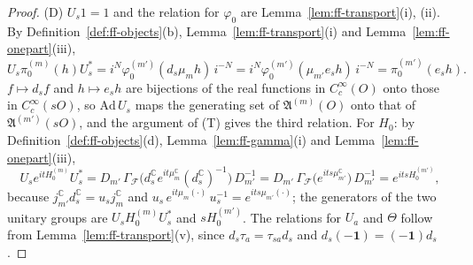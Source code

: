 \documentclass[11pt,a4paper]{article}
\theoremstyle{plain}
\theoremstyle{definition}
\theoremstyle{plain}
\theoremstyle{definition}
\newcommand{\C}{\mathbb{C}}
\newcommand{\A}{\mathfrak{A}}
\begin{document}
\begin{proof}
(D) $U_s1=1$ and the relation for $\varphi_0$ are Lemma~\ref{lem:ff-transport}(i), (ii).  By
Definition~\ref{def:ff-objects}(b), Lemma~\ref{lem:ff-transport}(i) and
Lemma~\ref{lem:ff-onepart}(iii),
\[
 U_s\pi_0^{(m)}(h)U_s^*=i^N\varphi_0^{(m')}(d_s\mu_mh)\,i^{-N}
 =i^N\varphi_0^{(m')}(\mu_{m'}e_sh)\,i^{-N}=\pi_0^{(m')}(e_sh) .
\]
$f\mapsto d_sf$ and $h\mapsto e_sh$ are bijections of the real functions in $C_c^\infty(O)$ onto
those in $C_c^\infty(sO)$, so $\mathrm{Ad}\,U_s$ maps the generating set of $\A^{(m)}(O)$ onto
that of $\A^{(m')}(sO)$, and the argument of (T) gives the third relation.  For $H_0$: by
Definition~\ref{def:ff-objects}(d), Lemma~\ref{lem:ff-gamma}(i) and
Lemma~\ref{lem:ff-onepart}(iii),
\[
 U_se^{itH_0^{(m)}}U_s^*
 =D_{m'}\,\Gamma_{\!\mathcal F}\bigl(d_s^{\C}e^{it\mu_m^{\C}}(d_s^{\C})^{-1}\bigr)\,D_{m'}^{-1}
 =D_{m'}\,\Gamma_{\!\mathcal F}\bigl(e^{its\mu_{m'}^{\C}}\bigr)\,D_{m'}^{-1}=e^{itsH_0^{(m')}} ,
\]
because $j_{m'}^{\C}d_s^{\C}=u_sj_m^{\C}$ and $u_s\,e^{it\mu_m(\cdot)}\,u_s^{-1}=
e^{its\mu_{m'}(\cdot)}$; the generators of the two unitary groups are $U_sH_0^{(m)}U_s^*$ and
$sH_0^{(m')}$.  The relations for $U_a$ and $\Theta$ follow from
Lemma~\ref{lem:ff-transport}(v), since $d_s\tau_a=\tau_{sa}d_s$ and $d_s(-\mathbf 1)=
(-\mathbf 1)d_s$.


\end{proof}
\end{document}

